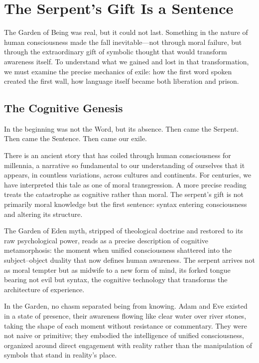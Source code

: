 \chapter{The Serpent's Gift Is a Sentence}

The Garden of Being was real, but it could not last. Something in the nature of human consciousness made the fall inevitable—not through moral failure, but through the extraordinary gift of symbolic thought that would transform awareness itself. To understand what we gained and lost in that transformation, we must examine the precise mechanics of exile: how the first word spoken created the first wall, how language itself became both liberation and prison.

\section{The Cognitive Genesis}

In the beginning was not the Word, but its absence.
Then came the Serpent.
Then came the Sentence.
Then came our exile.

There is an ancient story that has coiled through human consciousness for millennia, a narrative so fundamental to our understanding of ourselves that it appears, in countless variations, across cultures and continents. For centuries, we have interpreted this tale as one of moral transgression. A more precise reading treats the catastrophe as cognitive rather than moral. The serpent's gift is not primarily moral knowledge but the first sentence: syntax entering consciousness and altering its structure.

The Garden of Eden myth, stripped of theological doctrine and restored to its raw psychological power, reads as a precise description of cognitive metamorphosis: the moment when unified consciousness shattered into the subject–object duality that now defines human awareness. The serpent arrives not as moral tempter but as midwife to a new form of mind, its forked tongue bearing not evil but syntax, the cognitive technology that transforms the architecture of experience.

In the Garden, no chasm separated being from knowing. Adam and Eve existed in a state of presence, their awareness flowing like clear water over river stones, taking the shape of each moment without resistance or commentary. They were not naive or primitive; they embodied the intelligence of unified consciousness, organized around direct engagement with reality rather than the manipulation of symbols that stand in reality's place.

